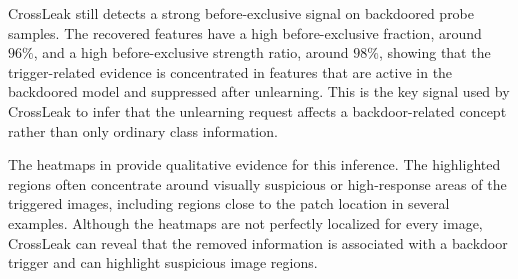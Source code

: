 CrossLeak still detects a strong before-exclusive signal on backdoored probe samples. The recovered features have a high before-exclusive fraction, around $96\%$, and a high before-exclusive strength ratio, around $98\%$, showing that the trigger-related evidence is concentrated in features that are active in the backdoored model and suppressed after unlearning. This is the key signal used by CrossLeak to infer that the unlearning request affects a backdoor-related concept rather than only ordinary class information.


The heatmaps in  provide qualitative evidence for this inference. The highlighted regions often concentrate around visually suspicious or high-response areas of the triggered images, including regions close to the patch location in several examples. Although the heatmaps are not perfectly localized for every image, CrossLeak can reveal that the removed information is associated with a backdoor trigger and can highlight suspicious image regions.



